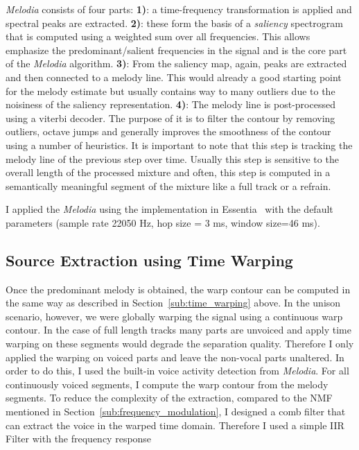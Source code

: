 \emph{Melodia} consists of four parts:
\noindent\textbf{1)}: a time-frequency transformation is applied and spectral peaks are extracted.
\textbf{2)}: these form the basis of a \emph{saliency} spectrogram that is computed using a weighted sum over all frequencies. This allows emphasize the predominant/salient frequencies in the signal and is the core part of the \emph{Melodia} algorithm.
\textbf{3)}: From the saliency map, again, peaks are extracted and then connected to a melody line. This would already a good starting point for the melody estimate but usually contains way to many outliers due to the noisiness of the saliency representation.
\textbf{4)}: The melody line is post-processed using a viterbi decoder.
The purpose of it is to filter the contour by removing outliers, octave jumps and generally improves the smoothness of the contour using a number of heuristics.
It is important to note that this step is tracking the melody line of the previous step over time.
Usually this step is sensitive to the overall length of the processed mixture and often, this step is computed in a semantically meaningful segment of the mixture like a full track or a refrain.
\par
I applied the \emph{Melodia} using the implementation in Essentia~\cite{bogdanov13} with the default parameters (sample rate 22050 Hz, hop size = 3 ms, window size=46 ms).

\subsection{Source Extraction using Time Warping}

Once the predominant melody is obtained, the warp contour can be computed in the same way as described in Section~\ref{sub:time_warping} above.
In the unison scenario, however, we were globally warping the signal using a continuous warp contour.
In the case of full length tracks many parts are unvoiced and apply time warping on these segments would degrade the separation quality.
Therefore I only applied the warping on voiced parts and leave the non-vocal parts unaltered.
In order to do this, I used the built-in voice activity detection from \emph{Melodia}.
For all continuously voiced segments, I compute the warp contour from the  melody segments.
To reduce the complexity of the extraction, compared to the NMF mentioned in Section~\ref{sub:frequency_modulation}, I designed a comb filter that can extract the voice in the warped time domain.
Therefore I used a simple IIR Filter with the frequency response

